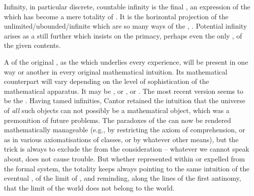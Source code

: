 %
Infinity, in particular discrete, countable infinity is the final
, an  expression of the  which
has become a mere totality of . It is the horizontal projection
of the unlimited/ubounded/infinite which are so many ways of 
the , .  Potential infinity arises as a still further
 which insists on the primacy, perhaps even the only
, of the  given contents.


A  of the original , as the  which
underlies every experience, will be present in one way or another in every
original mathematical intuition.  Its mathematical counterpart will vary
depending on the level of sophistication of the mathematical apparatus. It may
be , or ,  or .  The most recent
version seems to be the . Having tamed
infinities, Cantor retained the intuition that the universe of {\em all} such
objects can not possibly be a mathematical object, which was a premonition of
future problems.  The paradoxes of the  can now be rendered
mathematically manageable (e.g., by restricting the axiom of comprehension, or
as in various axiomatisations of classes, or by whatever other means), but the
trick is always to exclude the  from the
consideration -- whatever we cannot speak about, does not cause trouble.  But
whether represented within or expelled from the formal system, the totality keeps
always pointing to the same intuition of the eventual , of the
 limit of , and reminding, along the lines of
the first antinomy, that the limit of the world does not belong to the world.



